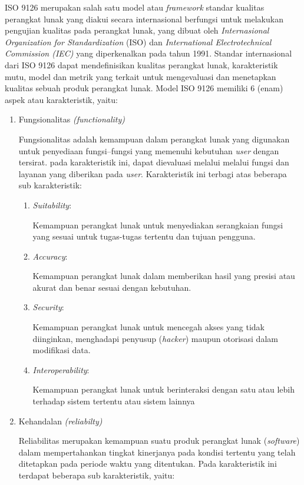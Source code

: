 ISO 9126 merupakan salah satu model atau \textit{framework} standar kualitas perangkat lunak yang diakui secara internasional berfungsi untuk melakukan pengujian kualitas pada perangkat lunak, yang dibuat oleh \textit{Internasional Organization for Standardization} (ISO) dan \textit{International Electrotechnical Commission (IEC)} yang diperkenalkan pada tahun 1991. Standar internasional dari ISO 9126 dapat mendefinisikan kualitas perangkat lunak, karakteristik mutu, model dan metrik yang terkait untuk mengevaluasi dan menetapkan kualitas sebuah produk perangkat lunak. Model ISO 9126 memiliki 6 (enam) aspek atau karakteristik, yaitu:  

\begin{enumerate}
	\item Fungsionalitas \textit{(functionality)}
	
	Fungsionalitas adalah kemampuan dalam perangkat lunak yang digunakan untuk penyediaan fungsi–fungsi yang memenuhi kebutuhan \textit{user} dengan tersirat. pada karakteristik ini, dapat dievaluasi melalui melalui fungsi dan layanan yang diberikan pada \textit{user}. Karakteristik ini terbagi atas beberapa sub karakteristik:

	\begin{enumerate}[label=\alph*)]
    \item \textit{Suitability}:
    
		Kemampuan perangkat lunak untuk menyediakan serangkaian fungsi yang sesuai untuk tugas-tugas tertentu dan tujuan pengguna.
    \item \textit{Accuracy}:
    
    Kemampuan perangkat lunak dalam memberikan hasil yang presisi atau akurat dan benar sesuai dengan kebutuhan.
    \item \textit{Security}:
    
		Kemampuan perangkat lunak untuk mencegah akses yang tidak
		diinginkan, menghadapi penyusup (\textit{hacker}) maupun otorisasi dalam modifikasi
		data. 
    \item \textit{Interoperability}:
    
    Kemampuan perangkat lunak untuk berinteraksi dengan satu atau lebih
		terhadap sistem tertentu atau sistem lainnya
	\end{enumerate}

	\item Kehandalan \textit{(reliabilty)}
	
	Reliabilitas merupakan kemampuan suatu produk perangkat lunak (\textit{software}) dalam mempertahankan tingkat kinerjanya pada kondisi tertentu yang telah ditetapkan pada periode waktu yang ditentukan. Pada karakteristik ini terdapat beberapa sub karakteristik, yaitu:


\end{enumerate}
